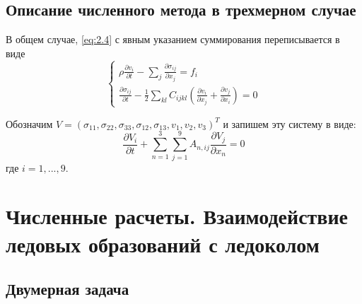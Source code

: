 \documentclass[12pt,a4paper, titlepage, openany]{book}
\begin{document}
\section{Описание численного метода в трехмерном случае}
В общем случае, \ref{eq:2.4} с явным указанием суммирования переписывается в виде
\begin{equation}
\begin{cases}
\rho \frac{\partial v_i}{\partial t} - \sum\limits_{j}\frac{\partial \sigma_{ij}}{\partial x_j} = f_i \\
\frac{\partial \sigma_{ij}}{\partial t} - \frac{1}{2} \sum\limits_{kl} C_{ijkl} (\frac{\partial v_i}{\partial x_j} + \frac{\partial v_j}{\partial x_i}) = 0
\end{cases}
\end{equation}
\par
Обозначим $V = (\sigma_{11}, \sigma_{22}, \sigma_{33}, \sigma_{12}, \sigma_{13}, v_1, v_2, v_3)^T$ и запишем эту систему в виде:
\begin{equation}
\frac{\partial V_i}{\partial t} + \sum\limits_{n=1}^3 \sum\limits_{j=1}^9 A_{n, ij} \frac{\partial V_j}{\partial x_n} = 0
\end{equation}
где $i = 1, ..., 9$.





\chapter{Численные расчеты. Взаимодействие ледовых образований с ледоколом}
\section{Двумерная задача}
\end{document}
